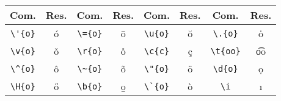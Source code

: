 % 
% 
% 
% 
% 
\begin{tabular}{cc|cc|cc|cc}
    \hline
    Com. & Res. & Com. & Res. & Com. & Res. & Com. & Res. \\ \hline
    \lstinline!\'{o}! & \'{o} & \lstinline!\={o}! & \={o} & \lstinline!\u{o}! & \u{o} & \lstinline!\.{o}! & \.{o} \\
    \lstinline!\v{o}! & \v{o} & \lstinline!\r{o}! & \r{o} & \lstinline!\c{c}! & \c{c} & \lstinline!\t{oo}! & \t{oo} \\
    \lstinline!\^{o}! & \^{o} & \lstinline!\~{o}! & \~{o} & \lstinline!\"{o}! & \"{o} & \lstinline!\d{o}! & \d{o} \\
    \lstinline!\H{o}! & \H{o} & \lstinline!\b{o}! & \b{o} & \lstinline!\`{o}! & \`{o} & \lstinline!\i! & \i \\ \hline
\end{tabular}
